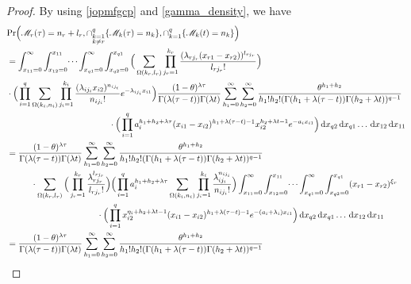 \documentclass[12pt,oneside,reqno]{amsart}
\numberwithin{equation}{section}
\theoremstyle{definition}
\numberwithin{equation}{section}
\theoremstyle{remarkstyle}
\begin{document}
\begin{proof}
	By using \eqref{jopmfgcp} and \eqref{gamma_density}, we have
{\footnotesize	\begin{align*}
		&\mathrm{Pr}\Big(\mathscr{M}_r(\tau)=n_r +l_r,\cap_{\substack{k=1\\ k\neq r}}^q\{\mathscr{M}_k(\tau)=n_k\},\cap_{k=1}^{q}\{\mathscr{M}_k(t)=n_k \} \Big)\nonumber\\
		&=\int_{x_{11}=0}^{\infty}\int_{x_{12}=0}^{x_{11}}\dots \int_{x_{q1}=0}^{\infty}\int_{x_{q2}=0}^{x_{q1}}
		\Big(\sum_{\Omega(k_r,l_r)}\prod_{j_r=1}^{k_r}\frac{(\lambda_{rj_r}(x_{r1}-x_{r2}))^{l_{rj_r}}}{l_{rj_r}!}\Big)\nonumber\\
		&\cdot\Big(\prod_{i=1}^{q}\sum_{\Omega(k_i,n_i)}\prod_{j_i=1}^{k_i}\frac{(\lambda_{ij_i}x_{i2})^{n_{ij_i}}}{n_{ij_i}!}e^{-\lambda_{ij_i}x_{i1}}\Big)
		\frac{(1-\theta)^{\lambda \tau}}{\Gamma(\lambda (\tau-t))\Gamma(\lambda t)}\sum_{h_1=0}^{\infty}\sum_{h_2=0}^{\infty}
		\frac{\theta^{h_1+h_2}}{h_1!h_2!(\Gamma(h_1+\lambda (\tau-t))\Gamma(h_2+\lambda t))^{q-1}}\nonumber\\		
		&\hspace{4.2cm}\cdot\Big(\prod_{i=1}^{q}a_i^{h_1+h_2+\lambda\tau}(x_{i1}-x_{i2})^{h_1+\lambda (\tau-t)-1}x_{i2}^{h_2+\lambda t-1}e^{-a_ix_{i1}}\Big)\,\mathrm{d}x_{q2}\,\mathrm{d}x_{q1}\dots\,\mathrm{d}x_{12}\,\mathrm{d}x_{11}\nonumber\\
		&=\frac{(1-\theta)^{\lambda \tau}}{\Gamma(\lambda (\tau-t))\Gamma(\lambda t)}\sum_{h_1=0}^{\infty}\sum_{h_2=0}^{\infty}
		\frac{\theta^{h_1+h_2}}{h_1!h_2!(\Gamma(h_1+\lambda (\tau-t))\Gamma(h_2+\lambda t))^{q-1}}\nonumber\\
		&\hspace{1cm}\cdot\sum_{\Omega(k_r,l_r)}\Big(\prod_{j_r=1}^{k_r}\frac{\lambda_{rj_r}^{l_{rj_r}}}{l_{rj_r}!}\Big)
		\Big(\prod_{i=1}^{q}a_i^{h_1+h_2+\lambda\tau}\sum_{\Omega(k_i,n_i)}\prod_{j_i=1}^{k_i}\frac{\lambda_{ij_i}^{n_{ij_i}}}{n_{ij_i}!}\Big)\int_{x_{11}=0}^{\infty}\int_{x_{12}=0}^{x_{11}}\dots \int_{x_{q1}=0}^{\infty}\int_{x_{q2}=0}^{x_{q1}}
		(x_{r1}-x_{r2})^{\xi_r}\nonumber\\
		&\hspace{3.7cm}\cdot\Big(\prod_{i=1}^{q}x_{i2}^{\eta_i+h_2+\lambda t-1}(x_{i1}-x_{i2})^{h_1+\lambda(\tau-t)-1}e^{-(a_i+\lambda_i)x_{i1}}\Big)\,\mathrm{d}x_{q2}\,\mathrm{d}x_{q1}\dots\,\mathrm{d}x_{12}\,\mathrm{d}x_{11}\nonumber\\
		&=\frac{(1-\theta)^{\lambda \tau}}{\Gamma(\lambda (\tau-t))\Gamma(\lambda t)}\sum_{h_1=0}^{\infty}\sum_{h_2=0}^{\infty}
		\frac{\theta^{h_1+h_2}}{h_1!h_2!(\Gamma(h_1+\lambda (\tau-t))\Gamma(h_2+\lambda t))^{q-1}}

\end{align*}}
\end{proof}
\end{document}

